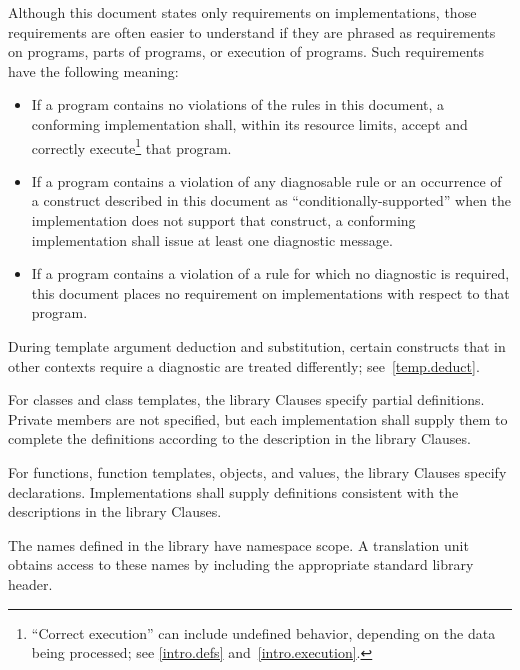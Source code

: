 \pnum
{}%
Although this document states only requirements on \Cpp{}
implementations, those requirements are often easier to understand if
they are phrased as requirements on programs, parts of programs, or
execution of programs. Such requirements have the following meaning:
\begin{itemize}
\item
If a program contains no violations of the rules in this
document, a conforming implementation shall,
within its resource limits, accept and correctly execute\footnote{``Correct execution'' can include undefined behavior, depending on
the data being processed; see \ref{intro.defs} and~\ref{intro.execution}.}
that program.
\item
{}%
If a program contains a violation of any diagnosable rule or an occurrence
of a construct described in this document as ``conditionally-supported'' when
the implementation does not support that construct, a conforming implementation
shall issue at least one diagnostic message.
\item
{}%
If a program contains a violation of a rule for which no diagnostic
is required, this document places no requirement on
implementations with respect to that program.
\end{itemize}
\begin{note}
During template argument deduction and substitution,
certain constructs that in other contexts require a diagnostic
are treated differently;
see~\ref{temp.deduct}.
\end{note}

\pnum
{}%
%
%
For classes and class templates, the library Clauses specify partial
definitions. Private members are not
specified, but each implementation shall supply them to complete the
definitions according to the description in the library Clauses.

\pnum
For functions, function templates, objects, and values, the library
Clauses specify declarations. Implementations shall supply definitions
consistent with the descriptions in the library Clauses.

\pnum
The names defined in the library have namespace
scope. A \Cpp{}  translation
unit obtains access to these names by including the
appropriate standard library header.

